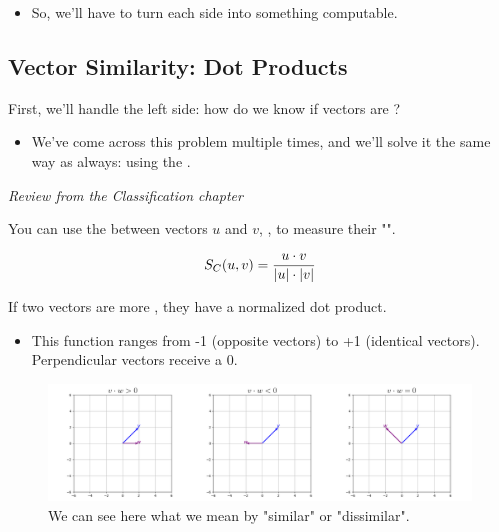         \begin{itemize}
            \item So, we'll have to turn each side into something computable.
        \end{itemize}



    \phantom{}

    \subsection{Vector Similarity: Dot Products}

        First, we'll handle the left side: how do we know if vectors are ? 
        
        \begin{itemize}
            \item We've come across this problem multiple times, and we'll solve it the same way as always: using the .\\
        \end{itemize}

        \begin{concept}
            \textit{Review from the Classification chapter}
            
            You can use the  between vectors $u$ and $v$, , to measure their "". 

            \begin{equation*}
                S_C(u,v) = \frac{u \cdot v}{\abs{u} \cdot \abs{v}}
            \end{equation*}
            
            If two vectors are more , they have a  normalized dot product. 

            \begin{itemize}
                \item This function ranges from -1 (opposite vectors) to +1 (identical vectors). Perpendicular vectors receive a 0.
            \end{itemize}
        \end{concept}


        \begin{figure}[H]
            \centering
            \includegraphics[width=140mm,scale=0.5]{images/transformers_images/dot_product_demo.png}
            
            
            \caption*{We can see here what we mean by "similar" or "dissimilar".}
        \end{figure}

